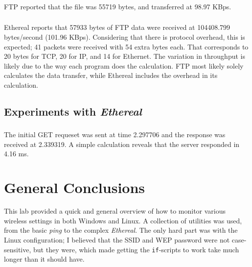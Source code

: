 \documentclass[11pt]{article}
\begin{document}
\subsubsection{}

FTP reported that the file was 55719 bytes, and transferred at 98.97 KBps.

\subsubsection{}

Ethereal reports that 57933 bytes of FTP data were received at 104408.799 bytes/second (101.96 KBps). Considering that there is protocol overhead, this is expected; 41 packets were received with 54 extra bytes each. That corresponds to 20 bytes for TCP, 20 for IP, and 14 for Ethernet. The variation in throughput is likely due to the way each program does the calculation. FTP most likely solely calculates the data transfer, while Ethereal includes the overhead in its calculation.

\subsection{Experiments with \emph{Ethereal}}

\subsubsection{}

The initial GET requeset was sent at time 2.297706 and the response was received at 2.339319. A simple calculation reveals that the server responded in 4.16 ms.

\subsubsection{}


\section{General Conclusions}

This lab provided a quick and general overview of how to monitor various wireless settings in both Windows and Linux. A collection of utilities was used, from the basic \emph{ping} to the complex \emph{Ethereal}. The only hard part was with the Linux configuration; I believed that the SSID and WEP password were not case-sensitive, but they were, which made getting the \verb|if|-scripts to work take much longer than it should have.
\end{document}
